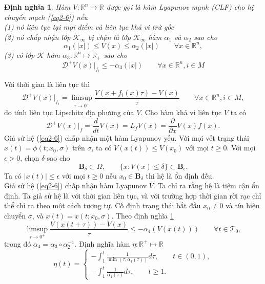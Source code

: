 \documentclass[14pt,a4paper,oneside]{report}		%
\newtheorem{define}[theorem]{Định nghĩa}
\begin{document}
\begin{define} \label{def2-4}
Hàm $V:\mathbb{R}^n\mapsto\mathbb{R}$ được gọi là hàm Lyapunov mạnh (CLF) cho hệ chuyển mạch (\ref{eq2-6}) nếu\\
(1) nó liên tục tại mọi điểm và liên tục khả vi trừ gốc\\
(2) nó chấp nhận lớp $\mathcal{K}_\infty$ bị chặn là lớp $\mathcal{K}_\infty$ hàm $\alpha_1$ và $\alpha_2$ sao cho
$$\alpha_1(|x|)\leq V(x)\leq \alpha_2(|x|)\qquad\forall x\in\mathbb{R}^n,$$
(3) có lớp $\mathcal{K}$ hàm $\alpha_3: \mathbb{R}^n\mapsto\mathbb{R}_+$ sao cho
\begin{equation} \label{eq2-7}
\mathcal{D}^+V(x)|_{f_i}\leq -\alpha_3(|x|)\qquad\forall x\in\mathbb{R}^n, i\in M
\end{equation}
\end{define}
Với thời gian là liên tục thì
\begin{equation} \label{eq2-8}
\mathcal{D}^+V(x)|_{f_i}=\limsup_{\tau\rightarrow 0^+}\frac{V(x+f_i(x)\tau)-V(x)}{\tau}\qquad\forall x\in\mathbb{R}^n,i\in M,
\end{equation}
do tính liên tục Lipschitz địa phương của $V$. Cho hàm khả vi liên tục $V$ ta có
$$\mathcal{D}^+V(x)|_f=\frac{d}{dt}V(x)=L_fV(x)=\frac{\partial}{\partial x}V(x)f(x).$$
Giả sử hệ (\ref{eq2-6}) chấp nhận một hàm Lyapunov yếu. Với mọi vết trạng thái $x(t)=\phi(t;x_0,\sigma)$ trên $\sigma$, ta có $V(x(t))\leq V(x_0)$ với mọi $t\geq 0$. Với mọi $\epsilon >0$, chọn $\delta$ sao cho
$$\mathbf{B}_\delta\subset\Omega , \qquad\{x:V(x)\leq\delta\}\subset\mathbf{B}_\epsilon .$$
Ta có $|x(t)|\leq\epsilon$ với mọi $t\geq 0$ nếu $x_0 \in\mathbf{B}_\delta$ thì hệ là ổn định đều.\\
Giả sử hệ (\ref{eq2-6}) chấp nhận hàm Lyapunov $V$. Ta chỉ ra rằng hệ là tiệm cận ổn định. Ta giả sử hệ là với thời gian liên tục, và với trường hợp thời gian rời rạc chỉ thể chỉ ra theo một cách tương tự. Cố định trạng thái bắt đầu $x_0 \neq 0$ và tín hiệu chuyển $\sigma$, và $x(t)=x(t;x_0,\sigma)$. Theo định nghĩa \ref{def2-4}
\begin{equation} \label{eq2-9}
\limsup_{\tau\rightarrow 0^+}\frac{V(x(t+\tau))-V(x)}{\tau}\leq -\alpha_4(V(x(t)))\qquad\forall t\in\mathcal{T}_0,
\end{equation}
trong đó $\alpha_4 = \alpha_3\circ\alpha_2^{-1}$. Định nghĩa hàm $\eta : \mathbb{R}^+\mapsto\mathbb{R}$
$$
\eta (t) = \left\{
\begin{array}{l}
-\int_1^t\frac{1}{\min(\tau,\alpha_4(\tau))}d\tau ,\qquad t\in (0,1),\\
-\int_1^t\frac{1}{\alpha_4(\tau)}d\tau , \qquad t\geq 1.
\end{array}\right.
$$
\end{document}
